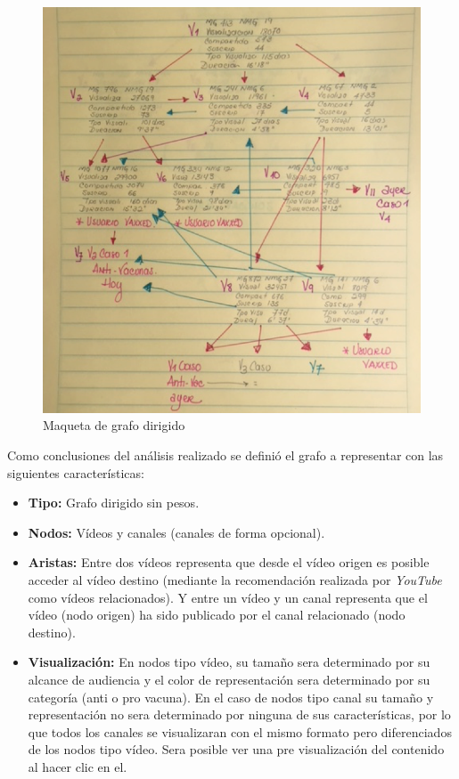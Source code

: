 \documentclass[11pt,a4paper]{article}
\begin{document}
\begin{figure}[H]
\centering
\includegraphics[scale=0.40]{grafo/pruebaManual.png}
\caption{Maqueta de grafo dirigido}
\end{figure}
\bigskip 

Como conclusiones del análisis realizado se definió el grafo a representar con las siguientes características:
\begin{itemize}
\item \textbf{Tipo:} Grafo dirigido sin pesos.
\item \textbf{Nodos:} Vídeos y canales (canales de forma opcional).
\item \textbf{Aristas:} Entre dos vídeos representa que desde el vídeo origen es posible acceder al vídeo destino (mediante la recomendación realizada por \textit{YouTube} como vídeos relacionados). Y entre un vídeo y un canal representa que el vídeo (nodo origen) ha sido publicado por el canal relacionado (nodo destino).
\item \textbf{Visualización:} En nodos tipo vídeo, su tamaño sera determinado por su alcance de audiencia y el color de representación sera determinado por su categoría (anti o pro vacuna). En el caso de nodos tipo canal su tamaño y representación no sera determinado por ninguna de sus características, por lo que todos los canales se visualizaran con el mismo formato pero diferenciados de los nodos tipo vídeo. Sera posible ver una pre visualización del contenido al hacer clic en el.
\end{itemize}
\end{document}
